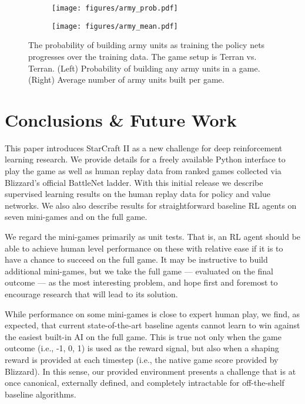 \documentclass{article}
\begin{document}
\begin{figure}[htp]
    \centering
    \begin{subfigure}{.5\textwidth}
      \centering
      \texttt{[image: figures/army\_prob.pdf]}
    \end{subfigure}\begin{subfigure}{.5\textwidth}
      \centering
      \texttt{[image: figures/army\_mean.pdf]}
    \end{subfigure}
    \caption{The probability of building army units as training the policy nets progresses over the training data. The game setup is Terran vs. Terran.
    (Left) Probability of building any army units in a game.
    (Right) Average number of army units built per game.}
    \label{fig:policy}
\end{figure}
 \section{Conclusions \& Future Work}

This paper introduces StarCraft II as a new challenge for deep reinforcement learning research.  We provide details for a freely available Python interface to play the game as well as human replay data from ranked games collected via Blizzard's official BattleNet ladder.  With this initial release we describe supervised learning results on the human replay data for policy and value networks.  We also also describe results for straightforward baseline RL agents on seven mini-games and on the full game.  

We regard the mini-games primarily as unit tests.  That is, an RL agent should be able to achieve human level performance on these with relative ease if it is to have a chance to succeed on the full game.  It may be instructive to build additional mini-games, but we take the full game --- evaluated on the final outcome --- as the most interesting problem, and hope first and foremost to encourage research that will lead to its solution.

While performance on some mini-games is close to expert human play, we find, as expected, that current state-of-the-art baseline agents cannot learn to win against the easiest built-in AI on the full game.  This is true not only when the game outcome (i.e., -1, 0, 1) is used as the reward signal, but also when a shaping reward is provided at each timestep (i.e., the native game score provided by Blizzard).
In this sense, our provided environment presents a challenge that is at once canonical, externally defined, and completely intractable for off-the-shelf baseline algorithms.
\end{document}
